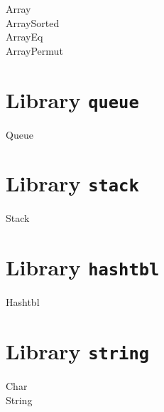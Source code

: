 \begin{description}
\item[Array] 
\item[ArraySorted] 
\item[ArrayEq] 
\item[ArrayPermut] 
\end{description}

\section{Library \texttt{queue}}

\begin{description}
\item[Queue] 
\end{description}

\section{Library \texttt{stack}}

\begin{description}
\item[Stack] 
\end{description}

\section{Library \texttt{hashtbl}}

\begin{description}
\item[Hashtbl] 
\end{description}

\section{Library \texttt{string}}

\begin{description}
\item[Char] 
\item[String] 
\end{description}

